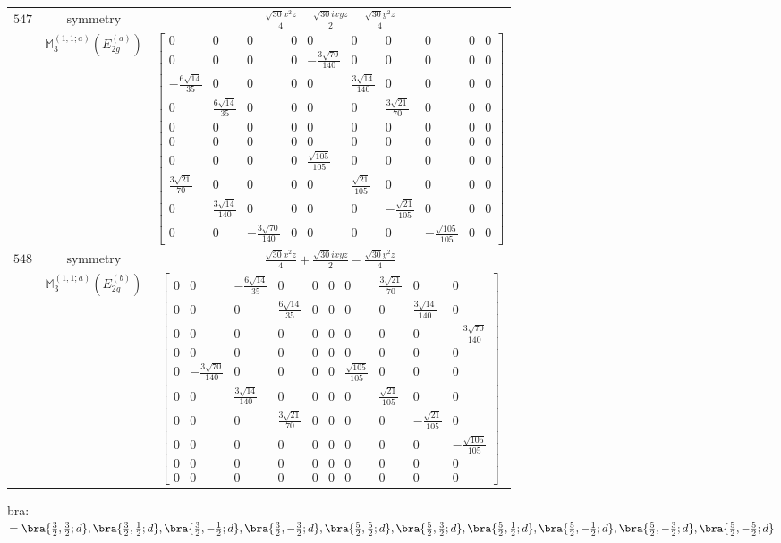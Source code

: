 \documentclass[fleqn,8pt,landscape]{jsarticle}
\begin{document}
\begin{longtable}{ccc}
$ 547 $ & $ \text{symmetry} $ & $ \frac{\sqrt{30} x^{2} z}{4} - \frac{\sqrt{30} i x y z}{2} - \frac{\sqrt{30} y^{2} z}{4} $ \\
$  $ & $ \mathbb{M}_{3}^{(1,1;a)}(E_{2g}^{(a)}) $ & $ \begin{bmatrix} 0 & 0 & 0 & 0 & 0 & 0 & 0 & 0 & 0 & 0 \\ 0 & 0 & 0 & 0 & - \frac{3 \sqrt{70}}{140} & 0 & 0 & 0 & 0 & 0 \\ - \frac{6 \sqrt{14}}{35} & 0 & 0 & 0 & 0 & \frac{3 \sqrt{14}}{140} & 0 & 0 & 0 & 0 \\ 0 & \frac{6 \sqrt{14}}{35} & 0 & 0 & 0 & 0 & \frac{3 \sqrt{21}}{70} & 0 & 0 & 0 \\ 0 & 0 & 0 & 0 & 0 & 0 & 0 & 0 & 0 & 0 \\ 0 & 0 & 0 & 0 & 0 & 0 & 0 & 0 & 0 & 0 \\ 0 & 0 & 0 & 0 & \frac{\sqrt{105}}{105} & 0 & 0 & 0 & 0 & 0 \\ \frac{3 \sqrt{21}}{70} & 0 & 0 & 0 & 0 & \frac{\sqrt{21}}{105} & 0 & 0 & 0 & 0 \\ 0 & \frac{3 \sqrt{14}}{140} & 0 & 0 & 0 & 0 & - \frac{\sqrt{21}}{105} & 0 & 0 & 0 \\ 0 & 0 & - \frac{3 \sqrt{70}}{140} & 0 & 0 & 0 & 0 & - \frac{\sqrt{105}}{105} & 0 & 0 \end{bmatrix} $ \\ \hline
$ 548 $ & $ \text{symmetry} $ & $ \frac{\sqrt{30} x^{2} z}{4} + \frac{\sqrt{30} i x y z}{2} - \frac{\sqrt{30} y^{2} z}{4} $ \\
$  $ & $ \mathbb{M}_{3}^{(1,1;a)}(E_{2g}^{(b)}) $ & $ \begin{bmatrix} 0 & 0 & - \frac{6 \sqrt{14}}{35} & 0 & 0 & 0 & 0 & \frac{3 \sqrt{21}}{70} & 0 & 0 \\ 0 & 0 & 0 & \frac{6 \sqrt{14}}{35} & 0 & 0 & 0 & 0 & \frac{3 \sqrt{14}}{140} & 0 \\ 0 & 0 & 0 & 0 & 0 & 0 & 0 & 0 & 0 & - \frac{3 \sqrt{70}}{140} \\ 0 & 0 & 0 & 0 & 0 & 0 & 0 & 0 & 0 & 0 \\ 0 & - \frac{3 \sqrt{70}}{140} & 0 & 0 & 0 & 0 & \frac{\sqrt{105}}{105} & 0 & 0 & 0 \\ 0 & 0 & \frac{3 \sqrt{14}}{140} & 0 & 0 & 0 & 0 & \frac{\sqrt{21}}{105} & 0 & 0 \\ 0 & 0 & 0 & \frac{3 \sqrt{21}}{70} & 0 & 0 & 0 & 0 & - \frac{\sqrt{21}}{105} & 0 \\ 0 & 0 & 0 & 0 & 0 & 0 & 0 & 0 & 0 & - \frac{\sqrt{105}}{105} \\ 0 & 0 & 0 & 0 & 0 & 0 & 0 & 0 & 0 & 0 \\ 0 & 0 & 0 & 0 & 0 & 0 & 0 & 0 & 0 & 0 \end{bmatrix} $ \\ \hline
\end{longtable}
bra: $=\bra{\frac{3}{2},\frac{3}{2};d}, \bra{\frac{3}{2},\frac{1}{2};d}, \bra{\frac{3}{2},- \frac{1}{2};d}, \bra{\frac{3}{2},- \frac{3}{2};d}, \bra{\frac{5}{2},\frac{5}{2};d}, \bra{\frac{5}{2},\frac{3}{2};d}, \bra{\frac{5}{2},\frac{1}{2};d}, \bra{\frac{5}{2},- \frac{1}{2};d}, \bra{\frac{5}{2},- \frac{3}{2};d}, \bra{\frac{5}{2},- \frac{5}{2};d}$
\end{document}
